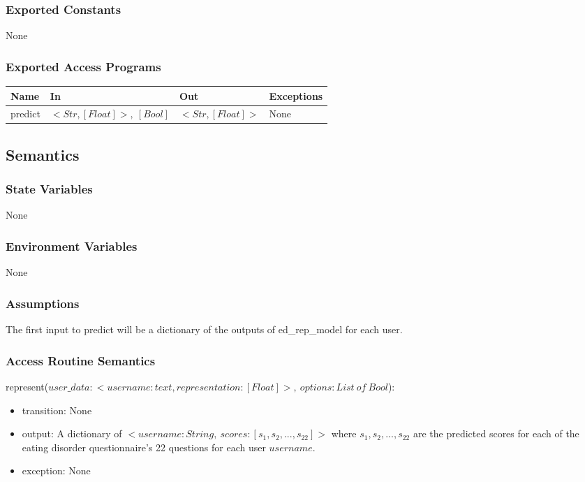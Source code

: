 \documentclass[12pt, titlepage]{article}
\begin{document}
\subsubsection{Exported Constants}

None

\subsubsection{Exported Access Programs}

\begin{center}
\begin{tabular}{p{3cm} p{5cm} p{4cm} p{3cm}}
\hline
\textbf{Name} & \textbf{In} & \textbf{Out} & \textbf{Exceptions} \\
\hline
predict & $<Str, [Float]>,\ [Bool]$ & $<Str, [Float]>$ & None \\
\hline
\end{tabular}
\end{center}

\subsection{Semantics}

\subsubsection{State Variables}

None

\subsubsection{Environment Variables}

None

\subsubsection{Assumptions}

The first input to predict will be a dictionary of the outputs of ed\_rep\_model for each user.

\subsubsection{Access Routine Semantics}

\noindent represent($user\_data: <username: text, representation: [Float]>,\ options: List\ of\ Bool$):
\begin{itemize}
\item transition: None
\item output: A dictionary of $<username: String,\ scores: [s_1, s_2, ..., s_{22}]>$ where $s_1, s_2, ..., s_{22}$ are the predicted scores for each of the eating disorder questionnaire's 22 questions for each user $username$.
\item exception: None
\end{itemize}
\end{document}
